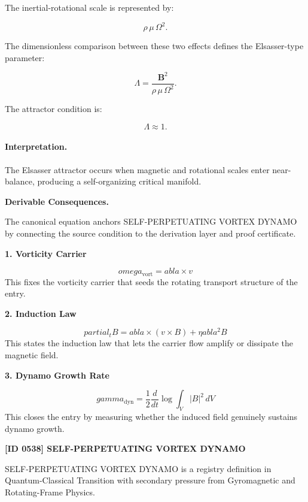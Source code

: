 The inertial-rotational scale is represented by:

\begin{equation}
\rho\,\mu\,\Omega^2 .
\end{equation}

The dimensionless comparison between these two effects defines the Elsasser-type parameter:

\begin{equation}
\boxed{
\Lambda
=
\frac{\mathbf{B}^2}
{\rho\,\mu\,\Omega^2}.
}
\end{equation}

The attractor condition is:

\begin{equation}
\Lambda \approx 1 .
\end{equation}

\paragraph{Interpretation.}
The Elsasser attractor occurs when magnetic and rotational scales enter near-balance, producing a self-organizing critical manifold.

\par\vspace{0.35em}
\noindent\textbf{Derivable Consequences.}\quad
\begingroup
\footnotesize
\raggedright
The canonical equation anchors SELF-PERPETUATING VORTEX DYNAMO by connecting the source condition to the derivation layer and proof certificate.
\par\endgroup

\noindent\textbf{1. Vorticity Carrier}\par
\[
omega_{\mathrm{vort}}= abla\times v
\]
\noindent This fixes the vorticity carrier that seeds the rotating transport structure of the entry.\par
\noindent\textbf{2. Induction Law}\par
\[
partial_t B= abla\times(v\times B)+\eta abla^2 B
\]
\noindent This states the induction law that lets the carrier flow amplify or dissipate the magnetic field.\par
\noindent\textbf{3. Dynamo Growth Rate}\par
\[
gamma_{\mathrm{dyn}}=\frac{1}{2}\frac{d}{dt}\log\!\int_V |B|^2\,dV
\]
\noindent This closes the entry by measuring whether the induced field genuinely sustains dynamo growth.\par

\clearpage
\noindent\textbf{[ID 0538] SELF-PERPETUATING VORTEX DYNAMO}\par
\vspace{0.35em}
\begingroup\small
{}
SELF-PERPETUATING VORTEX DYNAMO is a registry definition in Quantum-Classical Transition with secondary pressure from Gyromagnetic and Rotating-Frame Physics.

